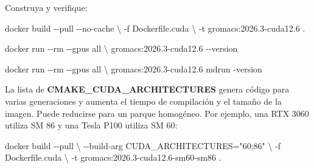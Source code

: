 \documentclass[
  spanish,
  11pt,
  a4paper]{article}
\newenvironment{Shaded}{\begin{snugshade}}{\end{snugshade}}
\newcommand{\AttributeTok}[1]{\textcolor[rgb]{0.13,0.29,0.53}{#1}}
\newcommand{\DataTypeTok}[1]{\textcolor[rgb]{0.13,0.29,0.53}{#1}}
\newcommand{\ExtensionTok}[1]{#1}
\newcommand{\KeywordTok}[1]{\textcolor[rgb]{0.13,0.29,0.53}{\textbf{#1}}}
\newcommand{\NormalTok}[1]{#1}
\newcommand{\OperatorTok}[1]{\textcolor[rgb]{0.81,0.36,0.00}{\textbf{#1}}}
\newcommand{\StringTok}[1]{\textcolor[rgb]{0.31,0.60,0.02}{#1}}
\begin{document}
\begin{Shaded}
\end{Shaded}

Construya y verifique:

\begin{Shaded}
\begin{Highlighting}[]
\ExtensionTok{docker}\NormalTok{ build }\AttributeTok{{-}{-}pull} \AttributeTok{{-}{-}no{-}cache} \DataTypeTok{\textbackslash{}}
  \AttributeTok{{-}f}\NormalTok{ Dockerfile.cuda }\DataTypeTok{\textbackslash{}}
  \AttributeTok{{-}t}\NormalTok{ gromacs:2026.3{-}cuda12.6 .}

\ExtensionTok{docker}\NormalTok{ run }\AttributeTok{{-}{-}rm} \AttributeTok{{-}{-}gpus}\NormalTok{ all }\DataTypeTok{\textbackslash{}}
\NormalTok{  gromacs:2026.3{-}cuda12.6 }\AttributeTok{{-}{-}version}

\ExtensionTok{docker}\NormalTok{ run }\AttributeTok{{-}{-}rm} \AttributeTok{{-}{-}gpus}\NormalTok{ all }\DataTypeTok{\textbackslash{}}
\NormalTok{  gromacs:2026.3{-}cuda12.6 mdrun }\AttributeTok{{-}version}
\end{Highlighting}
\end{Shaded}

La lista de \textbf{CMAKE\_CUDA\_ARCHITECTURES} genera código para
varias generaciones y aumenta el tiempo de compilación y el tamaño de la
imagen. Puede reducirse para un parque homogéneo. Por ejemplo, una RTX
3060 utiliza SM 86 y una Tesla P100 utiliza SM 60:

\begin{Shaded}
\begin{Highlighting}[]
\ExtensionTok{docker}\NormalTok{ build }\AttributeTok{{-}{-}pull} \DataTypeTok{\textbackslash{}}
  \AttributeTok{{-}{-}build{-}arg}\NormalTok{ CUDA\_ARCHITECTURES=}\StringTok{"60;86"} \DataTypeTok{\textbackslash{}}
  \AttributeTok{{-}f}\NormalTok{ Dockerfile.cuda }\DataTypeTok{\textbackslash{}}
  \AttributeTok{{-}t}\NormalTok{ gromacs:2026.3{-}cuda12.6{-}sm60{-}sm86 .}
\end{Highlighting}
\end{Shaded}
\end{document}
